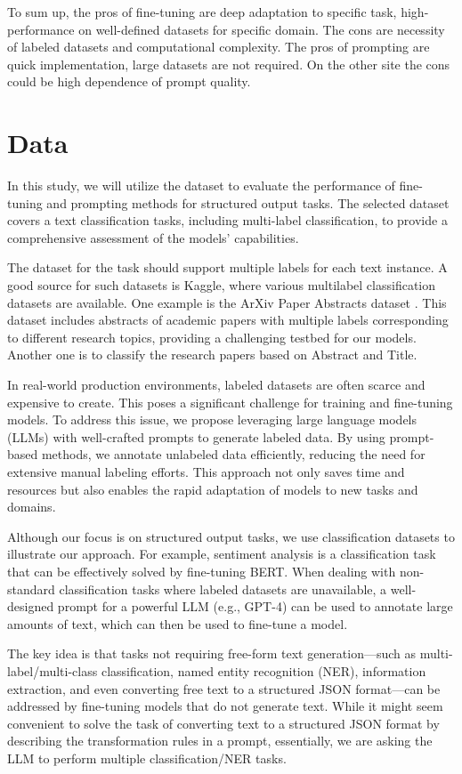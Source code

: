 \documentclass[11pt]{article}
\begin{document}
To sum up, the pros of fine-tuning are deep adaptation to specific task, high-performance on well-defined datasets for specific domain. The cons are necessity of labeled datasets and computational complexity. The pros of prompting are quick implementation, large datasets are not required. On the other site the cons could be high dependence of prompt quality.

\section{Data}

In this study, we will utilize the dataset to evaluate the performance of fine-tuning and prompting methods for structured output tasks. The selected dataset covers a text classification tasks, including multi-label classification, to provide a comprehensive assessment of the models’ capabilities.

The dataset for the task should support multiple labels for each text instance. A good source for such datasets is Kaggle, where various multilabel classification datasets are available. One example is the ArXiv Paper Abstracts dataset \cite{kaggle}. This dataset includes abstracts of academic papers with multiple labels corresponding to different research topics, providing a challenging testbed for our models. Another one is \cite{kaggle2} to classify the research papers based on Abstract and Title.

In real-world production environments, labeled datasets are often scarce and expensive to create. This poses a significant challenge for training and fine-tuning models. To address this issue, we propose leveraging large language models (LLMs) with well-crafted prompts to generate labeled data. By using prompt-based methods, we annotate unlabeled data efficiently, reducing the need for extensive manual labeling efforts. This approach not only saves time and resources but also enables the rapid adaptation of models to new tasks and domains.

Although our focus is on structured output tasks, we use classification datasets to illustrate our approach. For example, sentiment analysis is a classification task that can be effectively solved by fine-tuning BERT. When dealing with non-standard classification tasks where labeled datasets are unavailable, a well-designed prompt for a powerful LLM (e.g., GPT-4) can be used to annotate large amounts of text, which can then be used to fine-tune a model.

The key idea is that tasks not requiring free-form text generation—such as multi-label/multi-class classification, named entity recognition (NER), information extraction, and even converting free text to a structured JSON format—can be addressed by fine-tuning models that do not generate text. While it might seem convenient to solve the task of converting text to a structured JSON format by describing the transformation rules in a prompt, essentially, we are asking the LLM to perform multiple classification/NER tasks.
\end{document}
